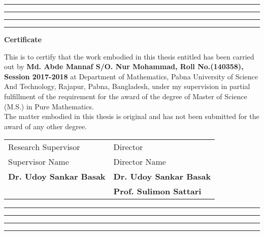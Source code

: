 \thispagestyle{empty}
\hrule\hrule\hrule\hrule %
\vspace{1 in}

\begin{center}

\textbf{\large Certificate}
\\
\end{center}
\justifying
This is to certify that the work embodied in this thesis entitled 
\textbf{} has been
carried out by \textbf{Md. Abde Mannaf S/O. Nur Mohammad, Roll No.(140358),
Session 2017-2018} at Department of Mathematics, Pabna University of Science 
And Technology, Rajapur, Pabna, Bangladesh, under my supervision in partial 
fulfillment of the requirement for the award of the degree of Master of Science (M.S.) 
in Pure Mathematics. 
\\The matter embodied in this thesis is original and has not been submitted for the award of any other degree.
\vspace{1 in}
\\
\begin{tabular} {l  l}
Research Supervisor  &\hspace{2 in}Director
\vspace{1 in}
\\
Supervisor Name & \hspace{2 in}Director Name\\
\bf Dr. Udoy Sankar Basak  &\hspace{2 in}\bf Dr. Udoy Sankar Basak \\
                          &\hspace{2 in}\bf Prof. Sulimon Sattari
   
\end{tabular}
\vfill
\hrule\hrule\hrule\hrule